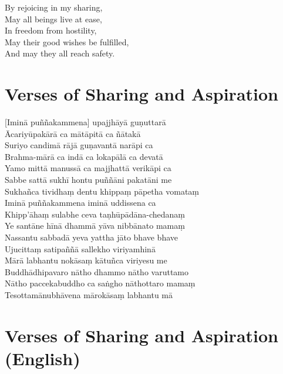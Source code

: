 By rejoicing in my sharing,\\
May all beings live at ease,\\
In freedom from hostility,\\
May their good wishes be fulfilled,\\
And may they all reach safety.

\section{Verses of Sharing and Aspiration}


\begin{leader}
\end{leader}


[Iminā puññakammena] upajjhāyā guṇuttarā\\
Ācariyūpakārā ca mātāpitā ca ñātakā\\
Suriyo candimā rājā guṇavantā narāpi ca\\
Brahma-mārā ca indā ca lokapālā ca devatā\\
Yamo mittā manussā ca majjhattā verikāpi ca\\
Sabbe sattā sukhī hontu puññāni pakatāni me\\
Sukhañca tividhaṃ dentu khippaṃ pāpetha vomataṃ\\
Iminā puññakammena iminā uddissena ca\\
Khipp'āhaṃ sulabhe ceva taṇhūpādāna-chedanaṃ\\
Ye santāne hīnā dhammā yāva nibbānato mamaṃ\\
Nassantu sabbadā yeva yattha jāto bhave bhave\\
Ujucittaṃ satipaññā sallekho viriyamhinā\\
Mārā labhantu nokāsaṃ kātuñca viriyesu me\\
Buddhādhipavaro nātho dhammo nātho varuttamo\\
Nātho paccekabuddho ca saṅgho nāthottaro mamaṃ\\
Tesottamānubhāvena mārokāsaṃ labhantu mā

\section{Verses of Sharing and Aspiration (English)}

\begin{leader}
\end{leader}

